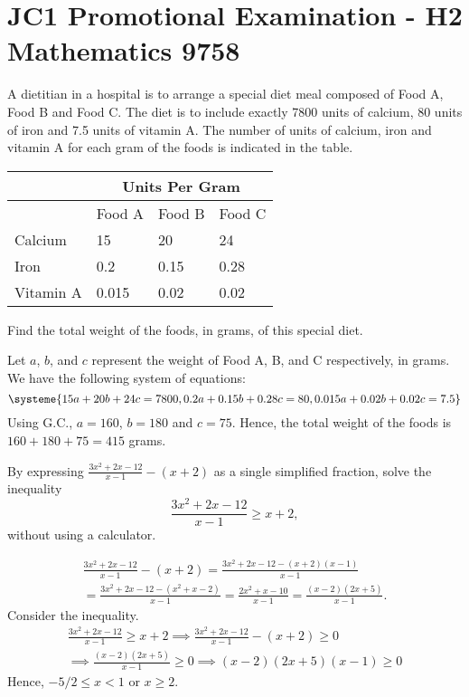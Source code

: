 \section{JC1 Promotional Examination - H2 Mathematics 9758}

\begin{problem}
    A dietitian in a hospital is to arrange a special diet meal composed of Food A, Food B and Food C. The diet is to include exactly 7800 units of calcium, 80 units of iron and 7.5 units of vitamin A. The number of units of calcium, iron and vitamin A for each gram of the foods is indicated in the table.

    \begin{table}[H]
        \centering
        \begin{tabular}{|l|l|l|l|}
        \hline
        & \multicolumn{3}{|c|}{Units Per Gram} \\\hline
        & Food A & Food B & Food C \\\hline
        Calcium & 15 & 20 & 24 \\\hline
        Iron & 0.2 & 0.15 & 0.28 \\\hline
        Vitamin A & 0.015 & 0.02 & 0.02\\\hline
        \end{tabular}
    \end{table}

    Find the total weight of the foods, in grams, of this special diet.
\end{problem}
\begin{solution}
    Let $a$, $b$, and $c$ represent the weight of Food A, B, and C respectively, in grams. We have the following system of equations: \[\systeme{15a + 20b + 24c = 7800,0.2a+0.15b+0.28c=80,0.015a+0.02b+0.02c = 7.5}\] Using G.C., $a=160$, $b=180$ and $c=75$. Hence, the total weight of the foods is $160 + 180 + 75 = 415$ grams.
\end{solution}

\begin{problem}
    By expressing $\frac{3x^2 + 2x - 12}{x-1} - (x+2)$ as a single simplified fraction, solve the inequality \[\frac{3x^2 + 2x - 12}{x-1} \geq x + 2,\] without using a calculator.
\end{problem}
\begin{solution}
    \begin{gather*}
        \frac{3x^2+2x-12}{x-1} - (x+2) = \frac{3x^2 + 2x - 12 - (x+2)(x-1)}{x-1}\\
        = \frac{3x^2 + 2x - 12 - (x^2 + x - 2)}{x-1} = \frac{2x^2 + x - 10}{x-1} = \frac{(x-2)(2x+5)}{x-1}.
    \end{gather*}
    Consider the inequality.
    \begin{gather*}
        \frac{3x^2 + 2x - 12}{x-1} \geq x + 2 \implies \frac{3x^2 + 2x - 12}{x-1} - (x+2) \geq 0\\
        \implies \frac{(x-2)(2x+5)}{x-1} \geq 0 \implies (x-2)(2x+5)(x-1) \geq 0
    \end{gather*}
    Hence, $-5/2 \leq x < 1$ or $x \geq 2$.
\end{solution}

